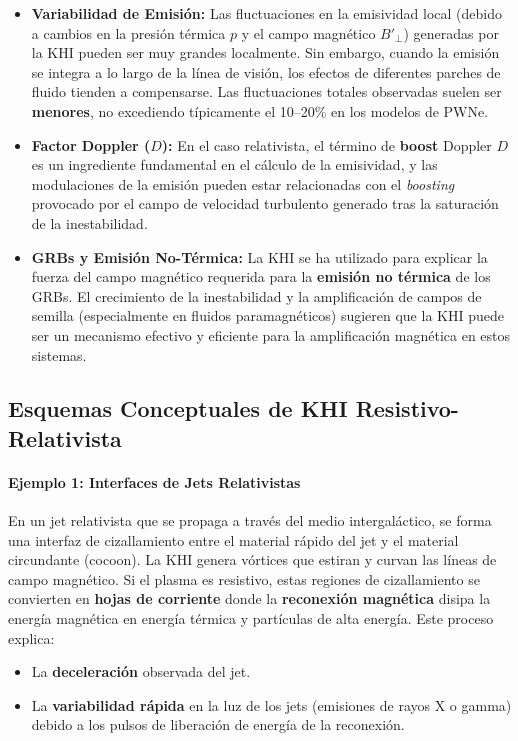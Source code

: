 \begin{itemize}
    \item \textbf{Variabilidad de Emisión:} Las fluctuaciones en la emisividad local (debido a cambios en la presión térmica $p$ y el campo magnético $B'_\perp$) generadas por la KHI pueden ser muy grandes localmente. Sin embargo, cuando la emisión se integra a lo largo de la línea de visión, los efectos de diferentes parches de fluido tienden a compensarse. Las fluctuaciones totales observadas suelen ser \textbf{menores}, no excediendo típicamente el 10–20\% en los modelos de PWNe.
    \item \textbf{Factor Doppler ($D$):} En el caso relativista, el término de \textbf{boost} Doppler $D$ es un ingrediente fundamental en el cálculo de la emisividad, y las modulaciones de la emisión pueden estar relacionadas con el \textit{boosting} provocado por el campo de velocidad turbulento generado tras la saturación de la inestabilidad.
    \item \textbf{GRBs y Emisión No-Térmica:} La KHI se ha utilizado para explicar la fuerza del campo magnético requerida para la \textbf{emisión no térmica} de los GRBs. El crecimiento de la inestabilidad y la amplificación de campos de semilla (especialmente en fluidos paramagnéticos) sugieren que la KHI puede ser un mecanismo efectivo y eficiente para la amplificación magnética en estos sistemas.
\end{itemize}

\subsection{Esquemas Conceptuales de KHI Resistivo-Relativista}

\paragraph{Ejemplo 1: Interfaces de Jets Relativistas}
En un jet relativista que se propaga a través del medio intergaláctico, se forma una interfaz de cizallamiento entre el material rápido del jet y el material circundante (cocoon). La KHI genera vórtices que estiran y curvan las líneas de campo magnético. Si el plasma es resistivo, estas regiones de cizallamiento se convierten en \textbf{hojas de corriente} donde la \textbf{reconexión magnética} disipa la energía magnética en energía térmica y partículas de alta energía. Este proceso explica:
\begin{itemize}
    \item La \textbf{deceleración} observada del jet.
    \item La \textbf{variabilidad rápida} en la luz de los jets (emisiones de rayos X o gamma) debido a los pulsos de liberación de energía de la reconexión.
\end{itemize}


